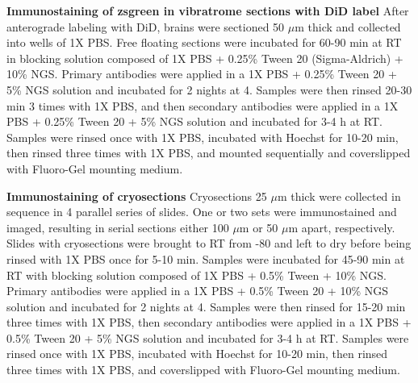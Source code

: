 \noindent\textbf{Immunostaining of zsgreen in vibratrome sections with DiD label} \newline
\indent After anterograde labeling with DiD, brains were sectioned 50 $\mu$m thick and collected into wells of 1X PBS.
Free floating sections were incubated for 60-90 min at RT in blocking solution composed of 1X PBS + 0.25\% Tween 20 (Sigma-Aldrich) + 10\% NGS.
Primary antibodies were applied in a 1X PBS + 0.25\% Tween 20 + 5\% NGS solution and incubated for 2 nights at 4\textcelsius.
Samples were then rinsed 20-30 min 3 times with 1X PBS, and then secondary antibodies were applied in a 1X PBS + 0.25\% Tween 20 + 5\% NGS solution and incubated for 3-4 h at RT.
Samples were rinsed once with 1X PBS, incubated with Hoechst for 10-20 min, then rinsed three times with 1X PBS, and mounted sequentially and coverslipped with Fluoro-Gel mounting medium.

\noindent\textbf{Immunostaining of cryosections} \newline
\indent Cryosections 25 $\mu$m thick were collected in sequence in 4 parallel series of slides.
One or two sets were immunostained and imaged, resulting in serial sections either 100 $\mu$m or 50 $\mu$m apart, respectively.
Slides with cryosections were brought to RT from -80\textcelsius{} and left to dry before being rinsed with 1X PBS once for 5-10 min.
Samples were incubated for 45-90 min at RT with blocking solution composed of 1X PBS + 0.5\% Tween + 10\% NGS.
Primary antibodies were applied in a 1X PBS + 0.5\% Tween 20 + 10\% NGS solution and incubated for 2 nights at 4\textcelsius.
Samples were then rinsed for 15-20 min three times with 1X PBS, then secondary antibodies were applied in a 1X PBS + 0.5\% Tween 20 + 5\% NGS solution and incubated for 3-4 h at RT.
Samples were rinsed once with 1X PBS, incubated with Hoechst for 10-20 min, then rinsed three times with 1X PBS, and coverslipped with Fluoro-Gel mounting medium.